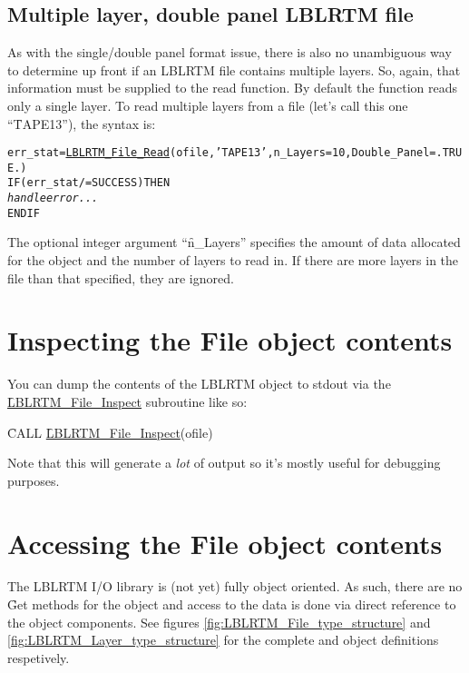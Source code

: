 \subsection{Multiple layer, double panel LBLRTM file}
As with the single/double panel format issue, there is also no unambiguous way to determine up front if an LBLRTM file contains multiple layers. So, again, that information must be supplied to the read function. By default the function reads only a single layer. To read multiple layers from a file (let's call this one ``\f{TAPE13}''), the syntax is:
\begin{alltt}
  err_stat = \hyperref[sec:LBLRTM_File_Read_interface]{LBLRTM_File_Read}(ofile, 'TAPE13', n_Layers=10, Double_Panel=.TRUE.)
  IF ( err_stat /= SUCCESS ) THEN
    \textrm{\textit{handle error...}}
  END IF\end{alltt}

The optional integer argument ``\f{n\_Layers}'' specifies the amount of data allocated for the \File{} object and the number of layers to read in. If there are more layers in the file than that specified, they are ignored. 



\section{Inspecting the File object contents}

You can dump the contents of the LBLRTM \File{} object to stdout via the \hyperref[sec:LBLRTM_File_Inspect_interface]{\f{LBLRTM\_File\_Inspect}} subroutine like so:

\hspace{0.4cm}\f{CALL }\hyperref[sec:LBLRTM_File_Read_interface]{\f{LBLRTM\_File\_Inspect}}(ofile)

Note that this will generate a \emph{lot} of output so it's mostly useful for debugging purposes.



\section{Accessing the File object contents}

The LBLRTM I/O library is (not yet) fully object oriented. As such, there are no \f{Get} methods for the \File{} object and access to the data is done via direct reference to the object components. See figures \ref{fig:LBLRTM_File_type_structure} and \ref{fig:LBLRTM_Layer_type_structure} for the complete \File{} and \Layer{} object definitions respetively.

